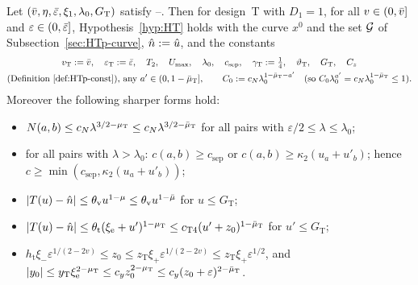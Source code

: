 \begin{theorem}\label{thm:HTp}
Let $(\bar v,\eta,\bar\varepsilon,\xi_1,\lambda_0,G_{\mathrm T})$ satisfy --. Then for design~T with $D_1=1$, for all $v\in(0,\bar v]$ and
$\varepsilon\in(0,\bar\varepsilon]$, Hypothesis~\ref{hyp:HT} holds with the curve $x^0$ and the set $\mathcal G$ of Subsection~\ref{sec:HTp-curve},
$\hat n:=\hat u$, and the constants
\begin{gather*}
v_{\mathrm T}:=\bar v,\quad\varepsilon_{\mathrm T}:=\bar\varepsilon,\quad T_2,\quad U_{\max},\quad\lambda_0,\quad c_{\mathrm{sep}},\quad
\gamma_{\mathrm T}:=\tfrac14,\quad\vartheta_{\mathrm T},\quad G_{\mathrm T},\quad C_z\\
\text{(Definition~\ref{def:HTp-const}), any }a'\in(0,1-\bar\mu_{\mathrm T}],\qquad C_0:=c_N\lambda_0^{1-\bar\mu_{\mathrm T}-a'}\quad(\text{so }C_0\lambda_0^{a'}
=c_N\lambda_0^{1-\bar\mu_{\mathrm T}}\le1).
\end{gather*}
Moreover the following sharper forms hold:
\begin{itemize}
\item[\textup{(T1$'$)}] $N(a,b)\le c_N\lambda^{3/2-\mu_{\mathrm T}}\le c_N\lambda^{3/2-\bar\mu_{\mathrm T}}$ for all pairs with $\varepsilon/2\le\lambda\le\lambda_0$;
\item[\textup{(T2$'$)}] for all pairs with $\lambda>\lambda_0$: $c(a,b)\ge c_{\mathrm{sep}}$ or $c(a,b)\ge\kappa_2(u_a+u'_b)$; hence
$c\ge\min(c_{\mathrm{sep}},\kappa_2(u_a+u'_b))$;
\item[\textup{(T3$'$)}] $|T(u)-\hat n|\le\theta_{\mathrm v}u^{1-\mu}\le\theta_{\mathrm v}u^{1-\bar\mu}$ for $u\le G_{\mathrm T}$;
\item[\textup{(T4$'$)}] $|T(u)-\hat n|\le\theta_{\mathrm t}(\xi_{\mathrm e}+u')^{1-\mu_{\mathrm T}}\le c_{\mathrm T4}(u'+z_0)^{1-\bar\mu_{\mathrm T}}$ for $u'\le G_{\mathrm T}$;
\item[\textup{(T5$'$)}] $h_{\mathrm t}\xi_-\varepsilon^{1/(2-2v)}\le z_0\le z_{\mathrm T}\xi_+\varepsilon^{1/(2-2v)}\le z_{\mathrm T}\xi_+\varepsilon^{1/2}$,
and $|y_0|\le y_{\mathrm T}\xi_{\mathrm e}^{2-\mu_{\mathrm T}}\le c_y z_0^{2-\mu_{\mathrm T}}\le c_y(z_0+\varepsilon)^{2-\bar\mu_{\mathrm T}}$.
\end{itemize}
\end{theorem}
